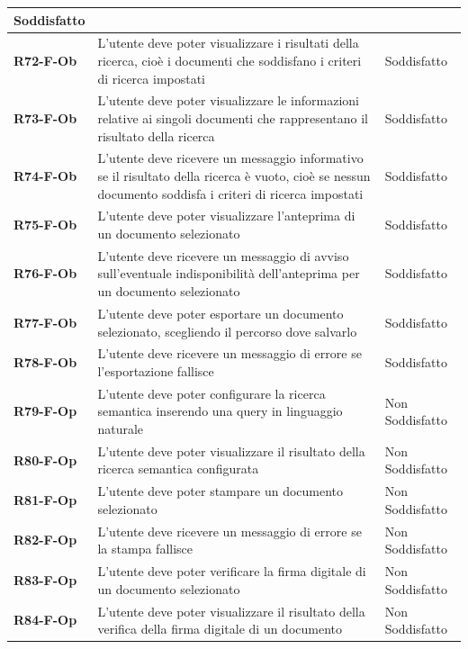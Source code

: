 \documentclass[a4paper,12pt]{article}
\begin{document}
{{{\begin{longtable}{|>{\centering\arraybackslash}m{}|>{\centering\arraybackslash}m{}|>{\centering\arraybackslash}m{}|}
                Soddisfatto \\ 
                \hline
                \textbf{R72-F-Ob} & L'utente deve poter visualizzare i risultati della ricerca, cioè i documenti che soddisfano i criteri di ricerca impostati & 
                Soddisfatto \\ 
                \hline
                \textbf{R73-F-Ob} & L'utente deve poter visualizzare le informazioni relative ai singoli documenti che rappresentano il risultato della ricerca & 
                Soddisfatto \\ 
                \hline
                \textbf{R74-F-Ob} & L'utente deve ricevere un messaggio informativo se il risultato della ricerca è vuoto, cioè se nessun documento soddisfa i criteri di ricerca impostati & 
                Soddisfatto \\ 
                \hline
                \textbf{R75-F-Ob} & L'utente deve poter visualizzare l'anteprima di un documento selezionato & 
                Soddisfatto \\ 
                \hline
                \textbf{R76-F-Ob} & L'utente deve ricevere un messaggio di avviso sull'eventuale indisponibilità dell'anteprima per un documento selezionato & 
                Soddisfatto \\ 
                \hline
                \textbf{R77-F-Ob} & L'utente deve poter esportare un documento selezionato, scegliendo il percorso dove salvarlo & 
                Soddisfatto \\ 
                \hline
                \textbf{R78-F-Ob} & L'utente deve ricevere un messaggio di errore se l'esportazione fallisce & 
                Soddisfatto \\ 
                \hline
                \textbf{R79-F-Op} & L'utente deve poter configurare la ricerca semantica inserendo una query in linguaggio naturale & 
                Non Soddisfatto \\ 
                \hline
                \textbf{R80-F-Op} & L'utente deve poter visualizzare il risultato della ricerca semantica configurata & 
                Non Soddisfatto \\ 
                \hline
                \textbf{R81-F-Op} & L'utente deve poter stampare un documento selezionato & 
                Non Soddisfatto \\ 
                \hline
                \textbf{R82-F-Op} & L'utente deve ricevere un messaggio di errore se la stampa fallisce & 
                Non Soddisfatto \\ 
                \hline
                \textbf{R83-F-Op} & L'utente deve poter verificare la firma digitale di un documento selezionato & 
                Non Soddisfatto \\ 
                \hline
                \textbf{R84-F-Op} & L'utente deve poter visualizzare il risultato della verifica della firma digitale di un documento & 
                Non Soddisfatto \\ 
                \hline
            \end{longtable}
        }
}}
\end{document}
